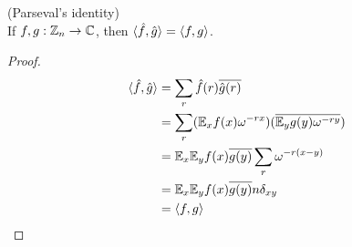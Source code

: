 \documentclass[a4paper]{article}
\begin{document}
\begin{lemma} (Parseval's identity)\\
    If $f,g: \mathbb{Z}_n \to \mathbb{C}$, then $\langle \hat{f},\hat{g}\rangle = \langle f,g\rangle$.
    \begin{proof}
        \begin{equation*}
            \begin{aligned}
                \langle\hat{f},\hat{g}\rangle &= \sum_r \hat{f}(r) \overline{\hat{g}(r)}\\
                &= \sum_r (\mathbb{E}_x f(x) \omega^{-rx}) (\overline{\mathbb{E}_y g(y) \omega^{-ry}})\\
                &= \mathbb{E}_x \mathbb{E}_y f(x) \overline{g(y)} \sum_r \omega^{-r(x-y)}\\
                &= \mathbb{E}_x \mathbb{E}_y f(x) \overline{g(y)} n\delta_{xy}\\
                &=\langle f,g\rangle
            \end{aligned}
            \end{equation*}
    \end{proof}
\end{lemma}
\end{document}
